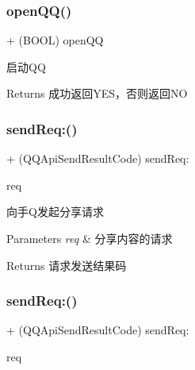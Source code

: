 \subsubsection{\texorpdfstring{open\+Q\+Q()}{openQQ()}\hspace{0.1cm}{\footnotesize\ttfamily [2/2]}}
{\footnotesize\ttfamily + (B\+O\+OL) open\+QQ \begin{DoxyParamCaption}{ }\end{DoxyParamCaption}}

启动\+QQ \begin{DoxyReturn}{Returns}
成功返回\+Y\+E\+S，否则返回\+NO 
\end{DoxyReturn}
\mbox{\label{interface_q_q_api_interface_aa7563c172cd93277d97cf21ec6755614}} 
\subsubsection{\texorpdfstring{send\+Req\+:()}{sendReq:()}\hspace{0.1cm}{\footnotesize\ttfamily [1/2]}}
{\footnotesize\ttfamily + (Q\+Q\+Api\+Send\+Result\+Code) send\+Req\+: \begin{DoxyParamCaption}\item[{(\mbox{\hyperlink{interface_q_q_base_req}{Q\+Q\+Base\+Req}} $\ast$)}]{req }\end{DoxyParamCaption}}

向手\+Q发起分享请求 
\begin{DoxyParams}{Parameters}
{\em req} & 分享内容的请求 \\
\hline
\end{DoxyParams}
\begin{DoxyReturn}{Returns}
请求发送结果码 
\end{DoxyReturn}
\mbox{\label{interface_q_q_api_interface_aa7563c172cd93277d97cf21ec6755614}} 
\subsubsection{\texorpdfstring{send\+Req\+:()}{sendReq:()}\hspace{0.1cm}{\footnotesize\ttfamily [2/2]}}
{\footnotesize\ttfamily + (Q\+Q\+Api\+Send\+Result\+Code) send\+Req\+: \begin{DoxyParamCaption}\item[{(\mbox{\hyperlink{interface_q_q_base_req}{Q\+Q\+Base\+Req}} $\ast$)}]{req }\end{DoxyParamCaption}}

